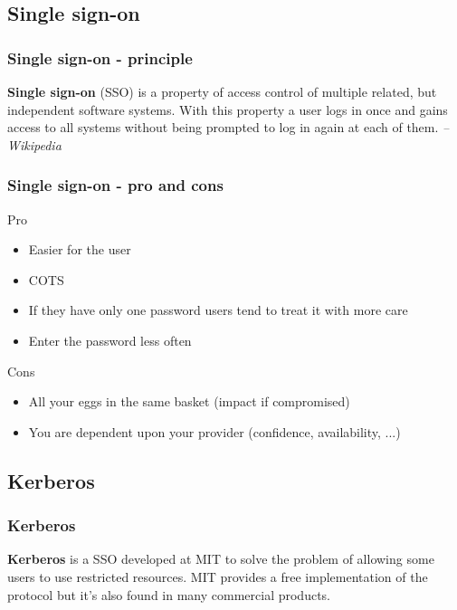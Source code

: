 \subsection{Single sign-on}

\begin{frame}
\frametitle{Single sign-on - principle}
\textbf{Single sign-on} (SSO) is a property of access control of multiple
related, but independent software systems. With this property a user
logs in once and gains access to all systems without being prompted to
log in again at each of them.
\textit{-- Wikipedia}
\end{frame}

\begin{frame}
\frametitle{Single sign-on - pro and cons}
\begin{block}{Pro}
\begin{itemize}
\item Easier for the user
\item COTS
\item If they have only one password users tend to treat it with more care
\item Enter the password less often
\end{itemize}
\end{block}
\begin{block}{Cons}
\begin{itemize}
\item All your eggs in the same basket (impact if compromised)
\item You are dependent upon your provider (confidence, availability, ...)
\end{itemize}
\end{block}
\end{frame}

\subsection{Kerberos}

\begin{frame}
\frametitle{Kerberos}
\textbf{Kerberos} is a SSO developed at MIT to solve the problem of allowing
some users to use restricted resources.
MIT provides a free implementation of the protocol but it's also found in many
commercial products.
\end{frame}

